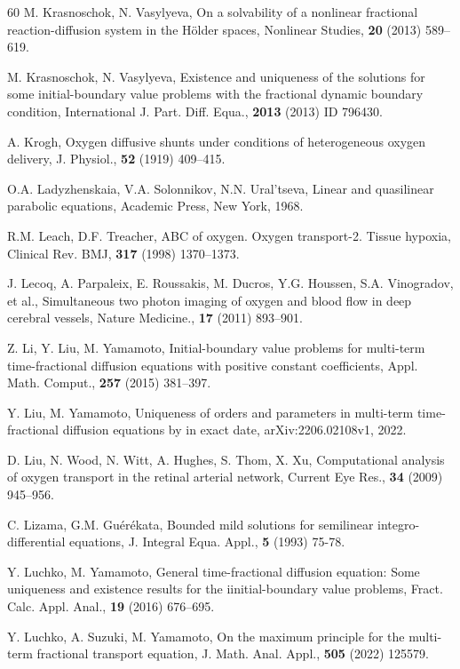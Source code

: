 \documentclass[reqno]{amsart}
\theoremstyle{definition}
\numberwithin{equation}{section}
\begin{document}
\begin{thebibliography}{60}
M. Krasnoschok, N. Vasylyeva, On a solvability of a nonlinear
fractional reaction-diffusion system in the H\"{o}lder spaces,
Nonlinear Studies, \textbf{20} (2013) 589--619.

M. Krasnoschok, N. Vasylyeva, Existence and uniqueness of the solutions for some initial-boundary value problems with the fractional dynamic boundary condition, International J. Part. Diff. Equa., \textbf{2013} (2013) ID 796430.

A. Krogh, Oxygen diffusive shunts under conditions of heterogeneous oxygen delivery, J. Physiol., \textbf{52} (1919) 409--415.



O.A. Ladyzhenskaia, V.A. Solonnikov, N.N. Ural'tseva,
Linear and quasilinear parabolic equations, Academic
Press, New York, 1968.

 R.M. Leach, D.F. Treacher, ABC of oxygen. Oxygen transport-2. Tissue hypoxia, Clinical Rev. BMJ, \textbf{317} (1998) 1370--1373.

J. Lecoq, A. Parpaleix, E. Roussakis, M. Ducros, Y.G. Houssen, S.A. Vinogradov, et al., Simultaneous two photon
imaging of oxygen and blood flow in deep cerebral vessels, Nature Medicine., \textbf{17} (2011) 893--901.


Z. Li, Y. Liu, M. Yamamoto, Initial-boundary value problems for multi-term time-fractional diffusion equations with positive constant coefficients,  Appl. Math. Comput., \textbf{257} (2015) 381--397.


 Y. Liu, M. Yamamoto, Uniqueness of orders and parameters in multi-term time-fractional diffusion equations by in exact date, arXiv:2206.02108v1, 2022.

D. Liu, N. Wood, N. Witt, A. Hughes, S. Thom, X. Xu, Computational analysis of oxygen transport in the retinal
arterial network, Current Eye Res., \textbf{34} (2009) 945--956.


C. Lizama, G.M. Gu\'{e}r\'{e}kata, Bounded mild solutions for semilinear integro-differential equations, J. Integral Equa. Appl., \textbf{5} (1993) 75-78.

Y. Luchko, M. Yamamoto, General time-fractional diffusion equation: Some uniqueness and existence results for the iinitial-boundary value problems,  Fract. Calc. Appl. Anal., \textbf{19} (2016) 676--695.

Y. Luchko, A. Suzuki, M. Yamamoto, On the maximum principle for the multi-term fractional transport equation, J. Math. Anal. Appl., \textbf{505}  (2022) 125579.


\end{thebibliography}
\end{document}
